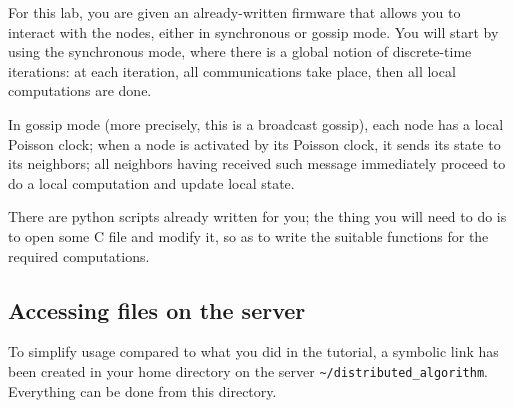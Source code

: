 \documentclass{article}
\begin{document}
For this lab, you are given
an already-written firmware that allows you to interact with the nodes,
either in synchronous or gossip mode.
You will start by using the synchronous mode,
where there is a global notion of discrete-time iterations: at each iteration,
all communications take place, then all local computations are done.

In gossip mode (more precisely, this is a broadcast gossip), each node has a local Poisson clock; when a node is activated by its Poisson clock, it sends its state to its neighbors; all neighbors having received such message immediately proceed to do a local computation and update local state.


There are python scripts already written for you; the thing you will need to do
is to open some C file and modify it, so as to write the suitable functions for
the required computations.

\subsection{Accessing files on the server}

To simplify usage compared to what you did in the tutorial, a symbolic link has been
created in your home directory on the server \verb=~/distributed_algorithm=.
Everything can be done from this directory.\\
\end{document}
